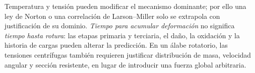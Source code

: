 Temperatura y tensión pueden modificar el mecanismo dominante; por ello una ley de Norton o una correlación de Larson--Miller solo se extrapola con justificación de su dominio. \emph{Tiempo para acumular deformación} no significa \emph{tiempo hasta rotura}: las etapas primaria y terciaria, el daño, la oxidación y la historia de cargas pueden alterar la predicción. En un álabe rotatorio, las tensiones centrífugas también requieren justificar distribución de masa, velocidad angular y sección resistente, en lugar de introducir una fuerza global arbitraria.


